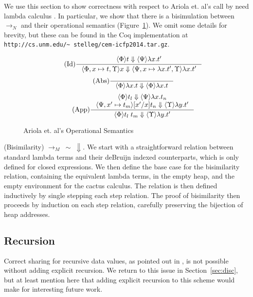 We use this section to show correctness with respect to Ariola et. al's call by
need lambda calculus \cite{ariola1995call}. In particular, we show that there is
a bisimulation between $\rightarrow_{N}$ and their operational semantics
(Figure~\ref{fig:cbn}). We omit some details for brevity, but these can be found
in the Coq implementation at \texttt{http://cs.unm.edu/\textasciitilde
stelleg/cem-icfp2014.tar.gz}.

\begin{figure}
\begin{align*}
\tag{Id} \inference
{\langle \Phi \rangle t \Downarrow \langle \Psi \rangle \lambda x.t'}
{\langle \Phi, x \mapsto t, \Upsilon \rangle x \Downarrow \langle \Psi, x
\mapsto \lambda x.t', \Upsilon \rangle \lambda x.t'}
\end{align*}
\begin{align*}
\tag{Abs} \inference 
{}
{\langle \Phi \rangle \lambda x . t \Downarrow \langle \Phi \rangle \lambda x.t}
\end{align*}
\begin{align*}
\tag{App} \inference
{\langle \Phi \rangle t_l \Downarrow \langle \Psi \rangle \lambda 
x.t_n \\ \langle \Psi, x' \mapsto t_m \rangle [x'/x]t_n \Downarrow \langle
\Upsilon \rangle \lambda y.t'}
{\langle \Phi \rangle t_l \; t_m \Downarrow \langle \Upsilon \rangle \lambda y.t'}
\end{align*}
\caption{Ariola et. al's Operational Semantics}
\label{fig:cbn}
\end{figure}

{\prop \textnormal{(Bisimilarity)} $\xrightarrow{}_{M} \; \sim \; \Downarrow$.}
We start with a straightforward relation between standard lambda terms and
their deBruijn indexed counterparts, which is only defined for closed
expressions. We then define the base case for the bisimilarity relation,
containing the equivalent lambda terms, in the empty heap, and the empty
environment for the cactus calculus. The relation is then defined inductively
by single stepping each step relation. The proof of bisimilarity then proceeds
by induction on each step relation, carefully preserving the bijection of heap
addresses.

\subsection{Recursion}

Correct sharing for recursive data values, as pointed out in
\cite{ariola1995call}, is not possible without adding explicit recursion. We
return to this issue in Section~\ref{sec:disc}, but at least mention here that
adding explicit recursion to this scheme would make for interesting future work.
